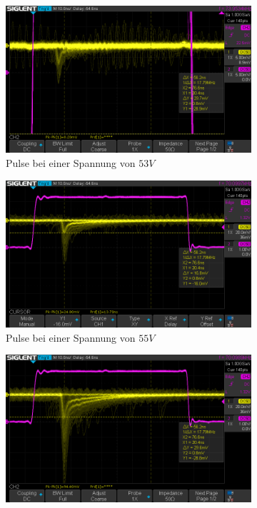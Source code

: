 \documentclass[12pt]{article}
\begin{document}
\begin{figure}[h!]
  \centering
  \begin{subfigure}{0.49\textwidth}
    \includegraphics[width=\textwidth]{Grafiken/4-1-4/4-4-53}
    \caption{Pulse bei einer Spannung von $53V$}
  \end{subfigure}
  \hfill
  \begin{subfigure}{0.49\textwidth}
    \includegraphics[width=\textwidth]{Grafiken/4-1-4/4-4-55}
    \caption{Pulse bei einer Spannung von $55V$}
  \end{subfigure}
  \hfill
  \begin{subfigure}{0.49\textwidth}
    \includegraphics[width=\textwidth]{Grafiken/4-1-4/4-4-58}

\end{subfigure}
\end{figure}
\end{document}
